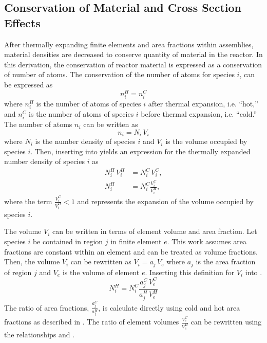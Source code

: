  \subsection{Conservation of Material and Cross Section Effects}
    \label{sec:cross_section_effects}
    After thermally expanding finite elements and area fractions within
    assemblies, material densities are decreased to conserve quantity of
    material in the reactor. In this derivation, the conservation of reactor 
    material is expressed as a conservation of number of atoms. The conservation 
    of the number of atoms for species $i$, can be expressed as
    \begin{equation}
      \label{eq:conservation}
      n_i^H = n_i^C 
    \end{equation}
    where $n_i^H$ is the number of atoms of species $i$ after thermal expansion,
    i.e. ``hot,'' 
    and $n_i^C$ is the number of atoms of species $i$ before thermal expansion,
    i.e. ``cold.'' The number of atoms $n_i$ can be written as 
    \begin{equation}
      \label{eq:nden_definition}
      n_i = N_i \, V_i
    \end{equation}
    where $N_i$ is the number density of species $i$ and $V_i$ is the volume
    occupied by species $i$. Then, inserting  into 
     yields an expression for the thermally expanded 
    number density of species $i$ as
    \begin{align}
      N_i^H \, V_i^H &= N_i^C \, V_i^C, \\
      \label{eq:nden_volume_ratio}
      N_i^H &= N_i^C \frac{V_i^C}{V_i^H},
    \end{align}
    where the term $\frac{V_i^C}{V_i^H} < 1$ and represents the expansion of the
    volume occupied by species $i$. 

    The volume $V_i$ can be written in terms of element volume and area
    fraction. Let species $i$ be contained in region $j$ in finite element $e$. 
    This work assumes area fractions are constant within an element and can be
    treated as volume fractions. Then, the volume $V_i$ can be rewritten as 
    $V_i = a_j \, V_e$ where $a_j$ is the area fraction of region $j$ and $V_e$
    is the volume of element $e$. Inserting this definition for $V_i$ into
    .
    \begin{equation}
      \label{eq:nden_expansion_expanded}
      N_i^H = N_i^C \frac{a_j^C \, V_e^C}{a_j^H \, V_e^H}
    \end{equation}
    The ratio of area fractions, $\frac{a_j^C}{a_j^H}$, is calculate directly
    using cold and hot area fractions as described in
    . The ratio of element volumes
    $\frac{V_e^C}{V_e^H}$ can be rewritten using the relationships
     and .

